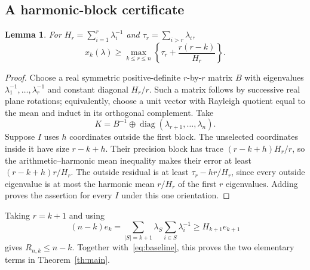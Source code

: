 \documentclass[11pt]{article}
\newtheorem{lemma}[theorem]{Lemma}
\theoremstyle{remark}\newtheorem{remark}[theorem]{Remark}
\newcommand{\diag}{\operatorname{diag}}
\begin{document}
\subsection{A harmonic-block certificate}
\begin{lemma}\label{le:harmonic}
For $H_r=\sum_{i=1}^r\lambda_i^{-1}$ and $\tau_r=\sum_{i>r}\lambda_i$,
\[
 x_k(\lambda)\ge
 \max_{k\le r\le n}\left\{\tau_r+\frac{r(r-k)}{H_r}\right\}.
\]
\end{lemma}
\begin{proof}
Choose a real symmetric positive-definite $r$-by-$r$ matrix $B$ with eigenvalues $\lambda_1^{-1},\ldots,\lambda_r^{-1}$ and constant diagonal $H_r/r$. Such a matrix follows by successive real plane rotations; equivalently, choose a unit vector with Rayleigh quotient equal to the mean and induct in its orthogonal complement. Take
\[
 K=B^{-1}\oplus\diag(\lambda_{r+1},\ldots,\lambda_n).
\]
Suppose $I$ uses $h$ coordinates outside the first block. The unselected coordinates inside it have size $r-k+h$. Their precision block has trace $(r-k+h)H_r/r$, so the arithmetic--harmonic mean inequality makes their error at least $(r-k+h)r/H_r$. The outside residual is at least $\tau_r-h r/H_r$, since every outside eigenvalue is at most the harmonic mean $r/H_r$ of the first $r$ eigenvalues. Adding proves the assertion for every $I$ under this one orientation.
\end{proof}
Taking $r=k+1$ and using
\[
 (n-k)e_k
 =\sum_{|S|=k+1}\lambda_S\sum_{i\in S}\lambda_i^{-1}
 \ge H_{k+1}e_{k+1}
\]
gives $R_{n,k}\le n-k$. Together with~\eqref{eq:baseline}, this proves the two elementary terms in Theorem~\ref{th:main}.
\end{document}
